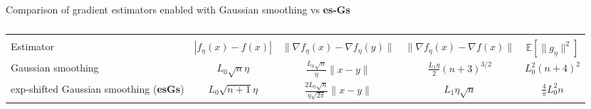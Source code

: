 \documentclass[11pt,reqno]{amsart}
\newcommand{\1}{{\bf 1}}
\newcommand{\2}{{\bf 2}}
\numberwithin{equation}{section}
\theoremstyle{remark}
\begin{document}
		\begin{table}[htb]
			\centering
			\caption{}{Comparison of {gradient estimators enabled with Gaussian smoothing vs {\bf es-Gs} }}
			\scriptsize
			\label{tab:estimators}
			\begin{tabular}{ C{2.7cm} c c c c }
				\hline
				&  &  &  &  \\
				Estimator &  $|f_{\eta}(x)-f(x)| $ & $\|\nabla f_{\eta}(x) - \nabla f_{\eta}(y)\|$ & $\|\nabla f_{\eta}(x) - \nabla f(x)\|$ &$\mathbb{E}[\|g_\eta\|^2] $\\
				\hline
				{Gaussian smoothing}~\cite{nesterov2017random}  &  $L_0\sqrt{n}\eta$   & $\frac{L_0\sqrt{n}}{\eta}\|x-y\|$   &$\frac{L_1\eta}{2}(n+3)^{3/2} $ & $L_0^2(n+4)^2$  \\
				\hline
					{exp-shifted Gaussian smoothing} ({\bf esGs})  &  $L_0\sqrt{n+1}\eta$   &  $\frac{2L_0\sqrt{n}}{\eta \sqrt{2 \pi}}\|x-y\|$  & $  L_1\eta \sqrt{n}$& $\frac{4}{\pi}L_0^2n$\\
				\hline
			\end{tabular}
		\end{table}
\end{document}
